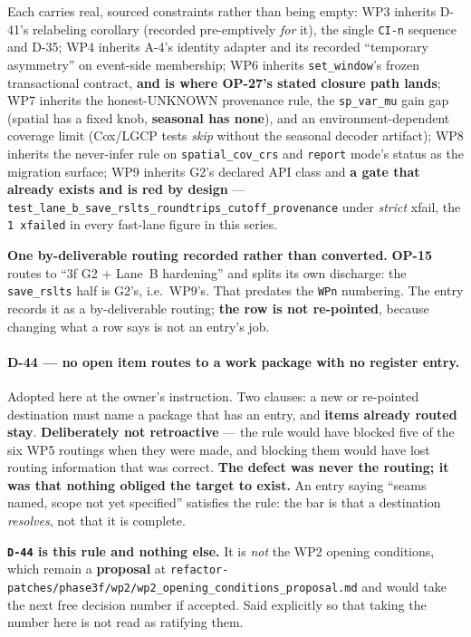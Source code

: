 \documentclass[
  10pt,
]{article}
\begin{document}
Each carries real, sourced constraints rather than being empty: WP3 inherits D-41's relabeling corollary (recorded pre-emptively \emph{for} it), the single \texttt{CI-n} sequence and D-35; WP4 inherits A-4's identity adapter and its recorded ``temporary asymmetry'' on event-side membership; WP6 inherits \texttt{set\_window}'s frozen transactional contract, \textbf{and is where OP-27's stated closure path lands}; WP7 inherits the honest-UNKNOWN provenance rule, the \texttt{sp\_var\_mu} gain gap (spatial has a fixed knob, \textbf{seasonal has none}), and an environment-dependent coverage limit (Cox/LGCP tests \emph{skip} without the seasonal decoder artifact); WP8 inherits the never-infer rule on \texttt{spatial\_cov\_crs} and \texttt{report} mode's status as the migration surface; WP9 inherits G2's declared API class and \textbf{a gate that already exists and is red by design} --- \texttt{test\_lane\_b\_save\_rslts\_roundtrips\_cutoff\_provenance} under \emph{strict} xfail, the \texttt{1 xfailed} in every fast-lane figure in this series.

\textbf{One by-deliverable routing recorded rather than converted.} \textbf{OP-15} routes to ``3f G2 + Lane~B hardening'' and splits its own discharge: the \texttt{save\_rslts} half is G2's, i.e.\ WP9's. That predates the \texttt{WPn} numbering. The entry records it as a by-deliverable routing; \textbf{the row is not re-pointed}, because changing what a row says is not an entry's job.

\paragraph{D-44 --- no open item routes to a work package with no register entry.}
Adopted here at the owner's instruction. Two clauses: a new or re-pointed destination must name a package that has an entry, and \textbf{items already routed stay}. \textbf{Deliberately not retroactive} --- the rule would have blocked five of the six WP5 routings when they were made, and blocking them would have lost routing information that was correct. \textbf{The defect was never the routing; it was that nothing obliged the target to exist.} An entry saying ``seams named, scope not yet specified'' satisfies the rule: the bar is that a destination \emph{resolves}, not that it is complete.

\textbf{\texttt{D-44} is this rule and nothing else.} It is \emph{not} the WP2 opening conditions, which remain a \textbf{proposal} at \texttt{refactor-patches/\allowbreak{}phase3f/wp2/\allowbreak{}wp2\_opening\_conditions\_proposal.md} and would take the next free decision number if accepted. Said explicitly so that taking the number here is not read as ratifying them.
\end{document}
